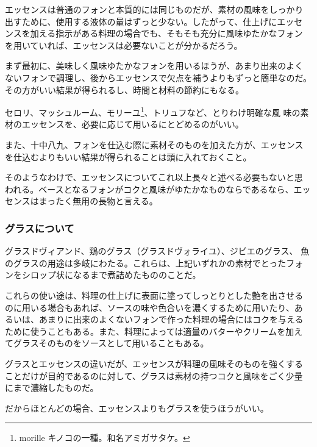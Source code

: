 \begin{recette}
エッセンスは普通のフォンと本質的には同じものだが、素材の風味をしっかり
出すために、使用する液体の量はずっと少ない。したがって、仕上げにエッセ
ンスを加える指示がある料理の場合でも、そもそも充分に風味ゆたかなフォン
を用いていれば、エッセンスは必要ないことが分かるだろう。

まず最初に、美味しく風味ゆたかなフォンを用いるほうが、あまり出来のよく
ないフォンで調理し、後からエッセンスで欠点を補うよりもずっと簡単なのだ。
その方がいい結果が得られるし、時間と材料の節約にもなる。

セロリ、マッシュルーム、モリーユ\footnote{morille
  キノコの一種。和名アミガサタケ。}、トリュフなど、とりわけ明確な風
味の素材のエッセンスを、必要に応じて用いるにとどめるのがいい。

また、十中八九、フォンを仕込む際に素材そのものを加えた方が、エッセンス
を仕込むよりもいい結果が得られることは頭に入れておくこと。

そのようなわけで、エッセンスについてこれ以上長々と述べる必要もないと思
われる。ベースとなるフォンがコクと風味がゆたかなものならであるなら、エッ
センスはまったく無用の長物と言える。

\maeaki

\hypertarget{glaces-diverses}{%
\subsubsection{グラスについて}\label{glaces-diverses}}



グラスドヴィアンド、鶏のグラス（グラスドヴォライユ）、ジビエのグラス、
魚のグラスの用途は多岐にわたる。これらは、上記いずれかの素材でとったフォ
ンをシロップ状になるまで煮詰めたもののことだ。

これらの使い途は、料理の仕上げに表面に塗ってしっとりとした艶を出させる
のに用いる場合もあれば、ソースの味や色合いを濃くするために用いたり、あ
るいは、あまりに出来のよくないフォンで作った料理の場合にはコクを与える
ために使うこともある。また、料理によっては適量のバターやクリームを加え
てグラスそのものをソースとして用いることもある。

グラスとエッセンスの違いだが、エッセンスが料理の風味そのものを強くする
ことだけが目的であるのに対して、グラスは素材の持つコクと風味をごく少量
にまで濃縮したものだ。

だからほとんどの場合、エッセンスよりもグラスを使うほうがいい。


\end{recette}
